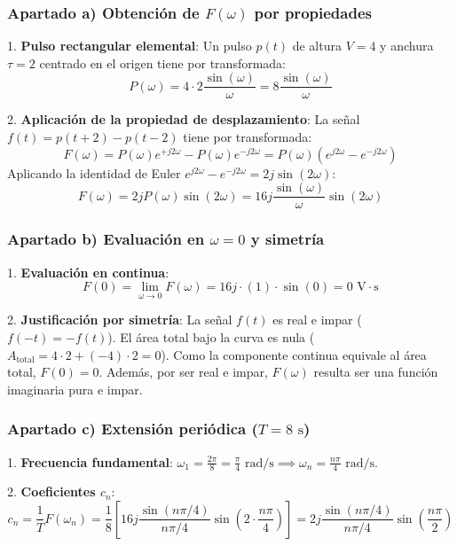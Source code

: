 \begin{resolucion}
\subsubsection*{Apartado a) Obtención de $F(\omega)$ por propiedades}

1. \textbf{Pulso rectangular elemental}:
   Un pulso $p(t)$ de altura $V = 4$ y anchura $\tau = 2$ centrado en el origen tiene por transformada:
   \[
   P(\omega) = 4 \cdot 2 \frac{\sin(\omega)}{ \omega} = 8 \frac{\sin(\omega)}{\omega}
   \]

2. \textbf{Aplicación de la propiedad de desplazamiento}:
   La señal $f(t) = p(t+2) - p(t-2)$ tiene por transformada:
   \[
   F(\omega) = P(\omega) e^{+j 2\omega} - P(\omega) e^{-j 2\omega} = P(\omega) \left( e^{j 2\omega} - e^{-j 2\omega} \right)
   \]
   Aplicando la identidad de Euler $e^{j 2\omega} - e^{-j 2\omega} = 2j \sin(2\omega)$:
   \[
   F(\omega) = 2j P(\omega) \sin(2\omega) = 16j \frac{\sin(\omega)}{\omega} \sin(2\omega)
   \]

\subsubsection*{Apartado b) Evaluación en $\omega = 0$ y simetría}

1. \textbf{Evaluación en continua}:
   \[
   F(0) = \lim_{\omega \to 0} F(\omega) = 16j \cdot (1) \cdot \sin(0) = 0\text{ V}\cdot\text{s}
   \]

2. \textbf{Justificación por simetría}:
   La señal $f(t)$ es real e impar ($f(-t) = -f(t)$). El área total bajo la curva es nula ($A_{\text{total}} = 4\cdot 2 + (-4)\cdot 2 = 0$). Como la componente continua equivale al área total, $F(0) = 0$. Además, por ser real e impar, $F(\omega)$ resulta ser una función imaginaria pura e impar.

\subsubsection*{Apartado c) Extensión periódica ($T = 8\text{ s}$)}

1. \textbf{Frecuencia fundamental}: $\omega_1 = \frac{2\pi}{8} = \frac{\pi}{4}\text{ rad/s} \implies \omega_n = \frac{n\pi}{4}\text{ rad/s}$.

2. \textbf{Coeficientes $c_n$}:
   \[
   c_n = \frac{1}{T} F(\omega_n) = \frac{1}{8} \left[ 16j \frac{\sin(n\pi/4)}{n\pi/4} \sin\left(2 \cdot \frac{n\pi}{4}\right) \right] = 2j \frac{\sin(n\pi/4)}{n\pi/4} \sin\left(\frac{n\pi}{2}\right)
   \]


\end{resolucion}
